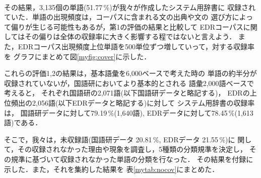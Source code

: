 {\mbox{} \\
その結果，3,135個の単語(51.77\,\%)が我々が作成したシステム用辞書に
収録されていた．単語の出現頻度は，コーパスに含まれる文の出典や文の
選び方によって偏りが生じる可能性もあるが，第1の評価の結果と比較して
EDRコーパスに関してはその偏りは全体の収録率に大きく影響する程ではないと言えよう．
また，EDRコーパス出現頻度上位単語を500単位ずつ増していって，対する収録率を
グラフにまとめて図\ref{myfig:cover}に示した．

これらの評価1,2の結果は，基本語彙を6,000ベースで考えた時の
単語の約半分が収録されていないが，国語研においてより基本的とされる
語彙2,000語ベースで考えると，
それぞれ国語研の2,071語(以下国語研データと略記する)，
EDRの上位頻出の2,056語(以下EDRデータと略記する)に対して
システム用辞書の収録率は，
国語研データに対して79.19\,\%(1,640語), 
EDRデータに対して78.45\,\%(1,613語)である．

そこで，我々は，未収録語(国語研データ 20.81\,\%, EDRデータ 21.55\,\%)に
関して，その収録されなかった理由や現象を調査し，5種類の分類規準を決定し，
その規準に基づいて収録されなかった単語の分類を行なった．
その結果を付録\cite{JUDIC_APPENDIX}に示した．また，それを集約した結果を
表\ref{mytab:nocov}にまとめた．


}
